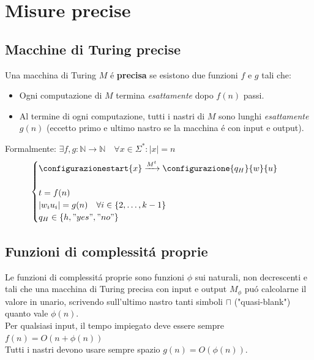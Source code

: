 \section{Misure precise}

\subsection{Macchine di Turing precise}
Una macchina di Turing $M$ é \textbf{precisa} se esistono due funzioni $f$ e $g$ tali che:
\begin{itemize}
	\item Ogni computazione di $M$ termina \textit{esattamente} dopo $f(n)$ passi.
	\item Al termine di ogni computazione, tutti i nastri di $M$ sono lunghi \textit{esattamente} $g(n)$ (eccetto primo e ultimo nastro se la macchina é con input e output).
\end{itemize}
Formalmente: $\exists f, g: \mathbb{N} \rightarrow \mathbb{N}  \quad \forall x \in \Sigma^* : |x| = n$
\[
\begin{cases}
	\configurazionestart{x} \xrightarrow{{M}^t} \configurazione{q_H}{w}{u} \\
	\\
	t = f(n) \\
	|w_i u_i|= g(n) \quad \forall i \in \{2, \dots, k-1\} \\
	q_H \in \{h, "yes", "no"\}
\end{cases}
\]

\subsection{Funzioni di complessitá proprie}
\label{sec:funzioni_proprie}
Le funzioni di complessitá proprie sono funzioni $\phi$ sui naturali, non decrescenti e tali che una macchina di Turing precisa con input e output $M_\phi$ puó calcolarne il valore in unario, scrivendo sull'ultimo nastro tanti simboli $\sqcap$ ("quasi-blank") quanto vale $\phi(n)$. \\
Per qualsiasi input, il tempo impiegato deve essere sempre $f(n) = O(n + \phi(n))$ \\
Tutti i nastri devono usare sempre spazio $g(n) = O(\phi(n))$. \\

